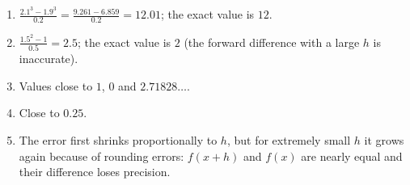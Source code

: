 \begin{enumerate}[label=\textbf{\ansnum.\arabic*}]
  \item $\frac{2.1^3-1.9^3}{0.2}=\frac{9.261-6.859}{0.2}=12.01$; the exact value is $12$.
  \item $\frac{1.5^2-1}{0.5}=2.5$; the exact value is $2$ (the forward difference with a large $h$ is inaccurate).
  \item Values close to $1$, $0$ and $2.71828\ldots$.
  \item Close to $0.25$.
  \item[\textbf{\ansnum.5}] The error first shrinks proportionally to $h$, but for extremely small $h$ it grows again because of rounding errors: $f(x+h)$ and $f(x)$ are nearly equal and their difference loses precision.
\end{enumerate}
